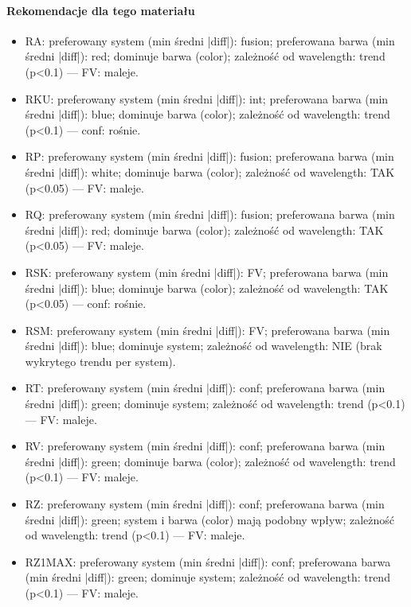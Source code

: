 \documentclass[
  10pt,
]{article}
\begin{document}
\paragraph{Rekomendacje dla tego materiału}
\begin{itemize}
\item RA: preferowany system (min średni |diff|): fusion; preferowana barwa (min średni |diff|): red; dominuje barwa (color); zależność od wavelength: trend (p<0.1) — FV: maleje.
\item RKU: preferowany system (min średni |diff|): int; preferowana barwa (min średni |diff|): blue; dominuje barwa (color); zależność od wavelength: trend (p<0.1) — conf: rośnie.
\item RP: preferowany system (min średni |diff|): fusion; preferowana barwa (min średni |diff|): white; dominuje barwa (color); zależność od wavelength: TAK (p<0.05) — FV: maleje.
\item RQ: preferowany system (min średni |diff|): fusion; preferowana barwa (min średni |diff|): red; dominuje barwa (color); zależność od wavelength: TAK (p<0.05) — FV: maleje.
\item RSK: preferowany system (min średni |diff|): FV; preferowana barwa (min średni |diff|): blue; dominuje barwa (color); zależność od wavelength: TAK (p<0.05) — conf: rośnie.
\item RSM: preferowany system (min średni |diff|): FV; preferowana barwa (min średni |diff|): blue; dominuje system; zależność od wavelength: NIE (brak wykrytego trendu per system).
\item RT: preferowany system (min średni |diff|): conf; preferowana barwa (min średni |diff|): green; dominuje system; zależność od wavelength: trend (p<0.1) — FV: maleje.
\item RV: preferowany system (min średni |diff|): conf; preferowana barwa (min średni |diff|): green; dominuje barwa (color); zależność od wavelength: trend (p<0.1) — FV: maleje.
\item RZ: preferowany system (min średni |diff|): conf; preferowana barwa (min średni |diff|): green; system i barwa (color) mają podobny wpływ; zależność od wavelength: trend (p<0.1) — FV: maleje.
\item RZ1MAX: preferowany system (min średni |diff|): conf; preferowana barwa (min średni |diff|): green; dominuje system; zależność od wavelength: trend (p<0.1) — FV: maleje.
\end{itemize}
\end{document}

